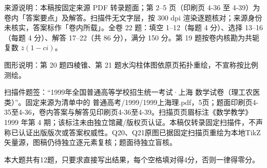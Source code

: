 

\begin{gktip}
来源说明：本稿按固定来源 PDF 转录题面；第 2–5 页（印刷页 4-36 至 4-39）为卷内「答案要点」及解答。扫描件无文字层，按 300 dpi 渲染逐题核对；来源身份未核实，答案标作「卷内所载」。全卷 22 题：填空 1–12（每题 4 分）、选择 13–16（每题 4 分）、解答 17–22（共 86 分），满分 150 分。第 19 题按卷内核勘为共轭复数 $\bar z(1-ci)$。

图形说明：第 20 题四棱锥、第 21 题水沟柱体图依原页拓扑重绘，不宣称按比例测绘。
\end{gktip}

扫描件题签：“1999年全国普通高等学校招生统一考试·上海 数学试卷（理工农医类）”。固定来源为清单中的 普通高考/1999/1999上海理.pdf，5页；题面印刷页4-35至4-36，卷内答案与解答见印刷页4-36至4-39。扫描页页眉标注《数学教学》1999 年第 4 期；该标注未由独立馆藏/版权页认证。本稿仅转录固定扫描件，不声称已认证出版版次或答案权威性。Q20、Q21原图已据固定扫描页重绘为本地TikZ矢量源，图稿仍待独立逐元素复核；题面待独立盲核。


本大题共有12题，只要求直接写出结果，每个空格填对得4分，否则一律得零分。

